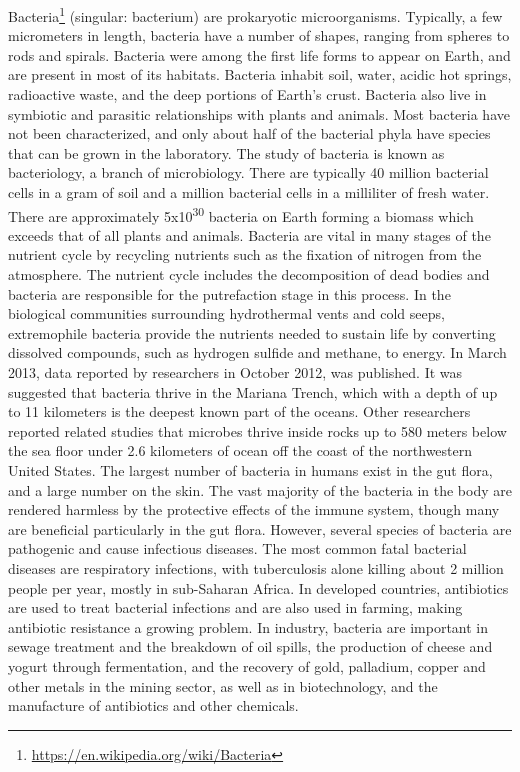 \documentclass[]{book}
\let\rmarkdownfootnote\footnote%
\def\footnote{\protect\rmarkdownfootnote}
\renewcommand{\href}[2]{#2\footnote{\url{#1}}}
\theoremstyle{definition}
\theoremstyle{definition}
\theoremstyle{definition}
\theoremstyle{remark}
\begin{document}
\href{https://en.wikipedia.org/wiki/Bacteria}{Bacteria} (singular:
bacterium) are prokaryotic microorganisms. Typically, a few micrometers
in length, bacteria have a number of shapes, ranging from spheres to
rods and spirals. Bacteria were among the first life forms to appear on
Earth, and are present in most of its habitats. Bacteria inhabit soil,
water, acidic hot springs, radioactive waste, and the deep portions of
Earth's crust. Bacteria also live in symbiotic and parasitic
relationships with plants and animals. Most bacteria have not been
characterized, and only about half of the bacterial phyla have species
that can be grown in the laboratory. The study of bacteria is known as
bacteriology, a branch of microbiology. There are typically 40 million
bacterial cells in a gram of soil and a million bacterial cells in a
milliliter of fresh water. There are approximately
5x10\textsuperscript{30} bacteria on Earth forming a biomass which
exceeds that of all plants and animals. Bacteria are vital in many
stages of the nutrient cycle by recycling nutrients such as the fixation
of nitrogen from the atmosphere. The nutrient cycle includes the
decomposition of dead bodies and bacteria are responsible for the
putrefaction stage in this process. In the biological communities
surrounding hydrothermal vents and cold seeps, extremophile bacteria
provide the nutrients needed to sustain life by converting dissolved
compounds, such as hydrogen sulfide and methane, to energy. In March
2013, data reported by researchers in October 2012, was published. It
was suggested that bacteria thrive in the Mariana Trench, which with a
depth of up to 11 kilometers is the deepest known part of the oceans.
Other researchers reported related studies that microbes thrive inside
rocks up to 580 meters below the sea floor under 2.6 kilometers of ocean
off the coast of the northwestern United States. The largest number of
bacteria in humans exist in the gut flora, and a large number on the
skin. The vast majority of the bacteria in the body are rendered
harmless by the protective effects of the immune system, though many are
beneficial particularly in the gut flora. However, several species of
bacteria are pathogenic and cause infectious diseases. The most common
fatal bacterial diseases are respiratory infections, with tuberculosis
alone killing about 2 million people per year, mostly in sub-Saharan
Africa. In developed countries, antibiotics are used to treat bacterial
infections and are also used in farming, making antibiotic resistance a
growing problem. In industry, bacteria are important in sewage treatment
and the breakdown of oil spills, the production of cheese and yogurt
through fermentation, and the recovery of gold, palladium, copper and
other metals in the mining sector, as well as in biotechnology, and the
manufacture of antibiotics and other chemicals.
\end{document}
